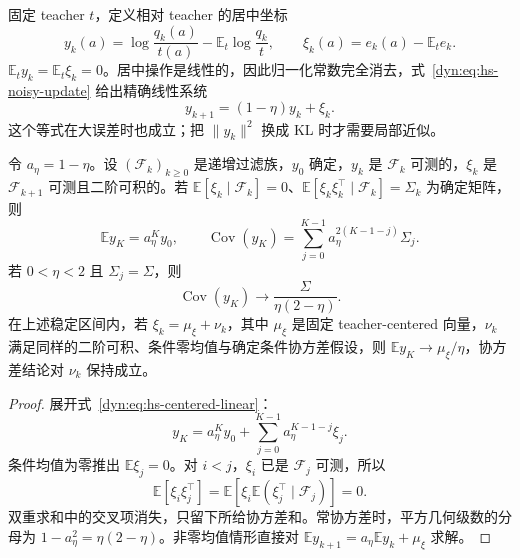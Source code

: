 \documentclass[lang=cn,scheme=chinese,openany]{../book/elegantbook}
\newcommand{\E}{\mathbb E}
\begin{document}
固定 teacher $t$，定义相对 teacher 的居中坐标
\begin{equation*}
 y_k(a)=\log\frac{q_k(a)}{t(a)}
       -\E_t\log\frac{q_k}{t},\qquad
 \xi_k(a)=e_k(a)-\E_te_k.
\end{equation*}
$\E_ty_k=\E_t\xi_k=0$。居中操作是线性的，因此归一化常数完全消去，式~\eqref{dyn:eq:hs-noisy-update} 给出精确线性系统
\begin{equation}\label{dyn:eq:hs-centered-linear}
 y_{k+1}=(1-\eta)y_k+\xi_k.
\end{equation}
这个等式在大误差时也成立；把 $\|y_k\|^2$ 换成 KL 时才需要局部近似。

\begin{theorem}\label{dyn:thm:hs-covariance}
令 $a_\eta=1-\eta$。设 $(\mathcal F_k)_{k\ge0}$ 是递增过滤族，$y_0$ 确定，$y_k$ 是 $\mathcal F_k$ 可测的，$\xi_k$ 是 $\mathcal F_{k+1}$ 可测且二阶可积的。若 $\E[\xi_k\mid\mathcal F_k]=0$、$\E[\xi_k\xi_k^\top\mid\mathcal F_k]=\Sigma_k$ 为确定矩阵，则
\begin{equation*}
 \E y_K=a_\eta^K y_0,\qquad
 \operatorname{Cov}(y_K)=\sum_{j=0}^{K-1}a_\eta^{2(K-1-j)}\Sigma_j.
\end{equation*}
若 $0<\eta<2$ 且 $\Sigma_j=\Sigma$，则
\begin{equation}\label{dyn:eq:hs-stationary-cov}
 \operatorname{Cov}(y_K)\longrightarrow
       \frac{\Sigma}{\eta(2-\eta)}.
\end{equation}
在上述稳定区间内，若 $\xi_k=\mu_\xi+\nu_k$，其中 $\mu_\xi$ 是固定 teacher-centered 向量，$\nu_k$ 满足同样的二阶可积、条件零均值与确定条件协方差假设，则 $\E y_K\to\mu_\xi/\eta$，协方差结论对 $\nu_k$ 保持成立。
\end{theorem}

\begin{proof}
展开式~\eqref{dyn:eq:hs-centered-linear}：
\begin{equation*}
 y_K=a_\eta^Ky_0+\sum_{j=0}^{K-1}a_\eta^{K-1-j}\xi_j.
\end{equation*}
条件均值为零推出 $\E\xi_j=0$。对 $i<j$，$\xi_i$ 已是 $\mathcal F_j$ 可测，所以
\begin{equation*}
 \E[\xi_i\xi_j^\top]
 =\E[\xi_i\E(\xi_j^\top\mid\mathcal F_j)]=0.
\end{equation*}
双重求和中的交叉项消失，只留下所给协方差和。常协方差时，平方几何级数的分母为 $1-a_\eta^2=\eta(2-\eta)$。非零均值情形直接对 $\E y_{k+1}=a_\eta\E y_k+\mu_\xi$ 求解。
\end{proof}
\end{document}
